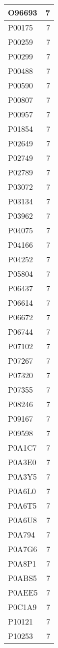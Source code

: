 \documentclass[
]{book}
\theoremstyle{definition}
\theoremstyle{definition}
\theoremstyle{definition}
\theoremstyle{definition}
\theoremstyle{remark}
\begin{document}
\begin{table}
\begin{tabular}{l|r}
\hline
O96693 & 7\\
\hline
P00175 & 7\\
\hline
P00259 & 7\\
\hline
P00299 & 7\\
\hline
P00488 & 7\\
\hline
P00590 & 7\\
\hline
P00807 & 7\\
\hline
P00957 & 7\\
\hline
P01854 & 7\\
\hline
P02649 & 7\\
\hline
P02749 & 7\\
\hline
P02789 & 7\\
\hline
P03072 & 7\\
\hline
P03134 & 7\\
\hline
P03962 & 7\\
\hline
P04075 & 7\\
\hline
P04166 & 7\\
\hline
P04252 & 7\\
\hline
P05804 & 7\\
\hline
P06437 & 7\\
\hline
P06614 & 7\\
\hline
P06672 & 7\\
\hline
P06744 & 7\\
\hline
P07102 & 7\\
\hline
P07267 & 7\\
\hline
P07320 & 7\\
\hline
P07355 & 7\\
\hline
P08246 & 7\\
\hline
P09167 & 7\\
\hline
P09598 & 7\\
\hline
P0A1C7 & 7\\
\hline
P0A3E0 & 7\\
\hline
P0A3Y5 & 7\\
\hline
P0A6L0 & 7\\
\hline
P0A6T5 & 7\\
\hline
P0A6U8 & 7\\
\hline
P0A794 & 7\\
\hline
P0A7G6 & 7\\
\hline
P0A8P1 & 7\\
\hline
P0ABS5 & 7\\
\hline
P0AEE5 & 7\\
\hline
P0C1A9 & 7\\
\hline
P10121 & 7\\
\hline
P10253 & 7\\

\end{tabular}
\end{table}
\end{document}
